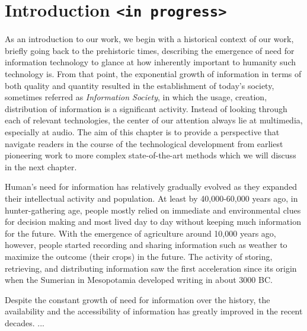 \normallinespacing

\chapter{Introduction \texttt{<in progress>}}


As an introduction to our work, we begin with a historical context of our work, briefly going back to the prehistoric times, describing the emergence of need for information technology to glance at how inherently important to humanity such technology is. From that point, the exponential growth of information in terms of both quality and quantity resulted in the establishment of today's society, sometimes referred as \textit{Information Society}, in which the usage, creation, distribution of information is a significant activity. Instead of looking through each of relevant technologies, the center of our attention always lie at multimedia, especially at audio. The aim of this chapter is to provide a perspective that navigate readers in the course of the technological development from earliest pioneering work to more complex state-of-the-art methods which we will discuss in the next chapter.
 
Human's need for information has relatively gradually evolved as they expanded their intellectual activity and population.
At least by 40,000-60,000 years ago, in hunter-gathering age, people mostly relied on immediate and environmental clues for decision making and most lived day to day without keeping much information for the future. With the emergence of agriculture around 10,000 years ago, however, people started recording and sharing information such as weather to maximize the outcome (their crops) in the future. The activity of storing, retrieving, and distributing information saw the first acceleration since its origin when the Sumerian in Mesopotamia developed writing in about 3000 BC.

Despite the constant growth of need for information over the history, the availability and the accessibility of information has greatly improved in the recent decades. ...

